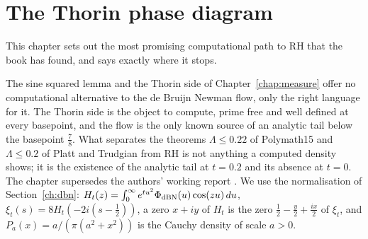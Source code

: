 \chapter{The Thorin phase diagram}\label{chap:phase}

This chapter sets out the most promising computational path to RH that the book has found, and says exactly where it stops.

The sine squared lemma and the Thorin side of Chapter~\ref{chap:measure} offer no computational alternative to the de Bruijn Newman flow, only the right language for it. The Thorin side is the object to compute, prime free and well defined at every basepoint, and the flow is the only known source of an analytic tail below the basepoint $\frac78$. What separates the theorems $\Lambda\le0.22$ of Polymath15 \cite{Polymath} and $\Lambda\le0.2$ of Platt and Trudgian \cite{PT21} from RH is not anything a computed density shows; it is the existence of the analytic tail at $t=0.2$ and its absence at $t=0$. The chapter supersedes the authors' working report \cite{FA26}. We use the normalisation of Section~\ref{ch:dbn}: $H_t(z)=\int_0^\infty e^{tu^2}\Phi_{\rm dBN}(u)\cos(zu)\,du$, $\xi_t(s)=8H_t(-2i(s-\frac12))$, a zero $x+iy$ of $H_t$ is the zero $\frac12-\frac y2+\frac{ix}2$ of $\xi_t$, and $P_a(x)=a/(\pi(a^2+x^2))$ is the Cauchy density of scale $a>0$.
